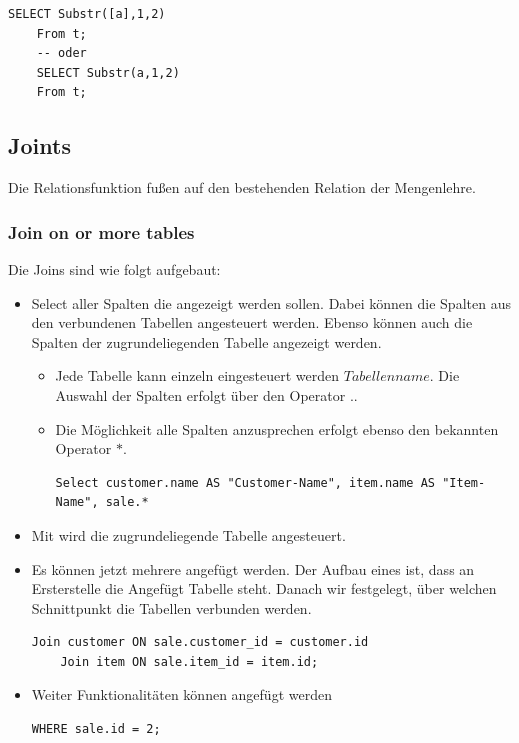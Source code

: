  \begin{lstlisting}[style=SQL]
	SELECT Substr([a],1,2)
	From t;
	-- oder
	SELECT Substr(a,1,2)
	From t;
 \end{lstlisting}

\subsection{Joints}
Die Relationsfunktion fußen auf den bestehenden Relation der Mengenlehre.\\

\subsubsection{Join on or more tables}
Die Joins sind wie folgt aufgebaut:
\begin{itemize}
	\item Select aller Spalten die angezeigt werden sollen. Dabei können die Spalten aus den verbundenen Tabellen angesteuert werden. Ebenso können auch die Spalten der zugrundeliegenden Tabelle angezeigt werden. 
	\begin{itemize}
		\item Jede Tabelle kann einzeln eingesteuert werden $Tabellenname$. Die Auswahl der Spalten erfolgt über den Operator $.$. 
		\item Die Möglichkeit alle Spalten anzusprechen erfolgt ebenso den bekannten Operator $*$. 
		\begin{lstlisting}[style=SQL]
			Select customer.name AS "Customer-Name", item.name AS "Item-Name", sale.*
		\end{lstlisting}
	\end{itemize}
	\item Mit  wird die zugrundeliegende Tabelle angesteuert.
	\item Es können jetzt mehrere  angefügt werden. Der Aufbau eines  ist, dass an Ersterstelle die Angefügt Tabelle steht. Danach wir festgelegt, über welchen Schnittpunkt die Tabellen verbunden werden.
	\begin{lstlisting}[style=SQL]
	Join customer ON sale.customer_id = customer.id
	Join item ON sale.item_id = item.id;
	\end{lstlisting}
	\item Weiter Funktionalitäten können angefügt werden
		\begin{lstlisting}[style=SQL]
	WHERE sale.id = 2;
	\end{lstlisting}
\end{itemize}

